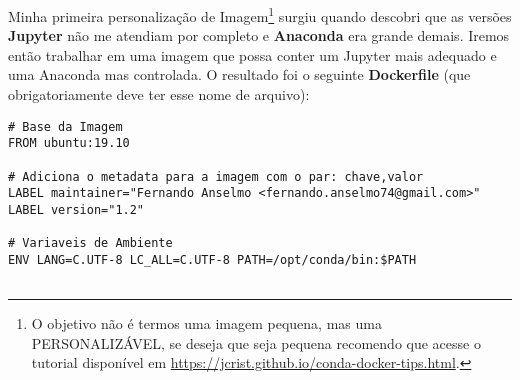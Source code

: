 Minha primeira personalização de Imagem\footnote{O objetivo não é termos uma imagem pequena, mas uma PERSONALIZÁVEL, se deseja que seja pequena recomendo que acesse o tutorial disponível em \url{https://jcrist.github.io/conda-docker-tips.html}.} surgiu quando descobri que as versões \textbf{Jupyter} não me atendiam por completo e \textbf{Anaconda} era grande demais. Iremos então trabalhar em uma imagem que possa conter um Jupyter mais adequado e uma Anaconda mas controlada. O resultado foi o seguinte \textbf{Dockerfile} (que obrigatoriamente deve ter esse nome de arquivo):
\begin{lstlisting}
# Base da Imagem
FROM ubuntu:19.10

# Adiciona o metadata para a imagem com o par: chave,valor
LABEL maintainer="Fernando Anselmo <fernando.anselmo74@gmail.com>"
LABEL version="1.2"

# Variaveis de Ambiente
ENV LANG=C.UTF-8 LC_ALL=C.UTF-8 PATH=/opt/conda/bin:$PATH


\end{lstlisting}
